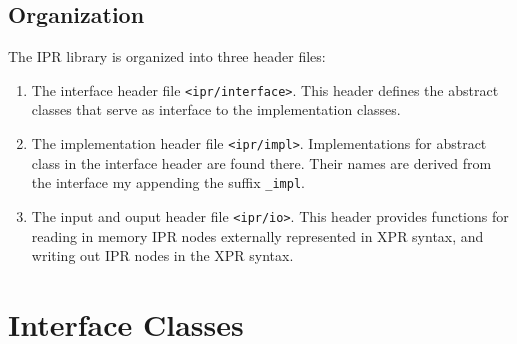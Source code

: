 \documentclass[a4paper,12pt]{article}
\begin{document}








\subsection{Organization}
\label{sec:intro:organization}

The IPR library is organized into three header files:
\begin{enumerate}
\item The interface header file \texttt{<ipr/interface>}.  This header defines
  the abstract classes that serve as interface to the implementation classes.

\item The implementation header file \texttt{<ipr/impl>}. 
  Implementations for abstract class in the interface header are found
  there.  Their names are derived from the interface my appending the
  suffix \texttt{\_impl}.

\item The input and ouput header file \texttt{<ipr/io>}.  This header provides
  functions for reading in memory IPR nodes externally represented in XPR
  syntax, and  writing out IPR nodes in the XPR syntax.
\end{enumerate}


\section{Interface Classes}
\label{sec:interface-classes}
\end{document}
